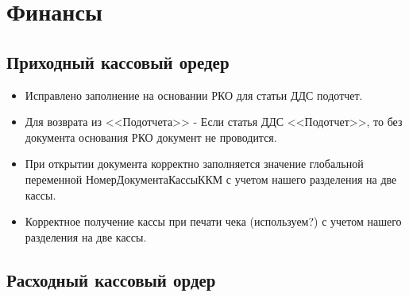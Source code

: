 \section{Финансы}
\subsection{Приходный кассовый оредер}


\begin{itemize}
	\item Исправлено заполнение на основании РКО для статьи ДДС подотчет.
	\item Для возврата из <<Подотчета>> - Если статья ДДС <<Подотчет>>, то без документа основания РКО документ не проводится.
	\item При открытии документа корректно заполняется значение глобальной переменной НомерДокументаКассыККМ
	с учетом нашего разделения на две кассы.
	\item Корректное получение кассы при печати чека (используем?)
	с учетом нашего разделения на две кассы.
\end{itemize}

\subsection{Расходный кассовый ордер}


